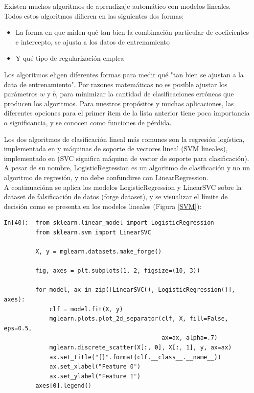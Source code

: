 {Existen muchos algoritmos de aprendizaje automático con modelos lineales. Todos estos algoritmos difieren en las siguientes dos formas:

\begin{itemize}
	\item La forma en que miden qué tan bien la  combinación particular de coeficientes 
	e intercepto, se ajusta a los datos de entrenamiento
	
	\item Y qué tipo de regularización emplea
\end{itemize}


Los algoritmos eligen diferentes formas para medir qué "tan bien se ajustan a la data de entrenamiento".   Por razones matemáticas no es posible ajustar los parámetros $w$ y $b$, para minimizar la cantidad de clasificaciones erróneas que producen los algoritmos. Para nuestros propósitos y muchas aplicaciones, las diferentes opciones para el primer item  de la lista anterior tiene poca importancia  o significancia, y se conocen como  funciones de pérdida.


Los dos algoritmos de clasificación lineal más comunes son la regresión logística,  implementada
en  {} y  máquinas de soporte de vectores lineal (SVM lineales), implementado en {} (SVC significa máquina de vector de soporte para clasificación).  A pesar de su nombre, LogisticRegression  es un algoritmo de clasificación y no un
algoritmo de regresión, y no debe confundirse con LinearRegression.\\


A continuaciónn se aplica los modelos {\ttfamily LogisticRegression} y {\ttfamily LinearSVC} sobre la dataset de falsificación de datos (forge dataset), y se visualizar el límite de decisión como se presenta en los modelos lineales (Figura \ref{SVM}):


\begin{lstlisting}
In[40]:  from sklearn.linear_model import LogisticRegression
         from sklearn.svm import LinearSVC
         
         X, y = mglearn.datasets.make_forge()
         
         fig, axes = plt.subplots(1, 2, figsize=(10, 3))
         
         for model, ax in zip([LinearSVC(), LogisticRegression()], axes):
             clf = model.fit(X, y)
             mglearn.plots.plot_2d_separator(clf, X, fill=False, eps=0.5,
                                             ax=ax, alpha=.7)
             mglearn.discrete_scatter(X[:, 0], X[:, 1], y, ax=ax)
             ax.set_title("{}".format(clf.__class__.__name__))
             ax.set_xlabel("Feature 0")
             ax.set_ylabel("Feature 1")
         axes[0].legend()
\end{lstlisting}


}
